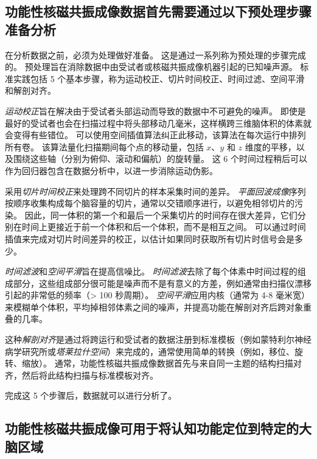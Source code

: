 


\subsection{功能性核磁共振成像数据首先需要通过以下预处理步骤准备分析}

在分析数据之前，必须为处理做好准备。 
这是通过一系列称为预处理的步骤完成的。 
预处理旨在消除数据中由受试者或核磁共振成像机器引起的已知噪声源。 
标准实践包括 5 个基本步骤，称为运动校正、切片时间校正、时间过滤、空间平滑和解剖对齐。


\textit{运动校正}旨在解决由于受试者头部运动而导致的数据中不可避免的噪声。
即使是最好的受试者也会在扫描过程中将头部移动几毫米，这样横跨三维脑体积的体素就会变得有些错位。
可以使用空间插值算法纠正此移动，该算法在每次运行中排列所有卷。
该算法量化扫描期间每个点的移动量，包括 $x$、$y$ 和 $z$ 维度的平移，以及围绕这些轴（分别为俯仰、滚动和偏航）的旋转量。
这 6 个时间过程稍后可以作为回归器包含在数据分析中，以进一步消除运动伪影。


采用\textit{切片时间校正}来处理跨不同切片的样本采集时间的差异。
\textit{平面回波成像}序列按顺序收集构成每个脑容量的切片，通常以交错顺序进行，以避免相邻切片的污染。
因此，同一体积的第一个和最后一个采集切片的时间存在很大差异，它们分别在时间上更接近于前一个体积和后一个体积，而不是相互之间。
可以通过时间插值来完成对切片时间差异的校正，以估计如果同时获取所有切片时信号会是多少。


\textit{时间滤波}和\textit{空间平滑}旨在提高信噪比。
\textit{时间滤波}去除了每个体素中时间过程的组成部分，这些组成部分很可能是噪声而不是有意义的方差，例如通常由扫描仪漂移引起的非常低的频率（> 100 秒周期）。 
\textit{空间平滑}应用内核（通常为 4-8 毫米宽）来模糊单个体积，平均掉相邻体素之间的噪声，并提高功能在解剖对齐后跨对象重叠的几率。


这种\textit{解剖对齐}是通过将跨运行和受试者的数据注册到标准模板（例如蒙特利尔神经病学研究所或\textit{塔莱拉什空间}）来完成的，通常使用简单的转换（例如，移位、旋转、缩放）。
通常，功能性核磁共振成像数据首先与来自同一主题的结构扫描对齐，然后将此结构扫描与标准模板对齐。


完成这 5 个步骤后，数据就可以进行分析了。



\subsection{功能性核磁共振成像可用于将认知功能定位到特定的大脑区域}

